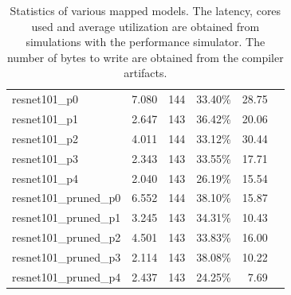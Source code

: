 \begin{table}[hbtp]
\begin{tabular}{@{}lrrrrr@{}}
resnet101\_p0           & 7.080                                                           & 144            & 33.40\%            & 28.75                                                             \\
resnet101\_p1           & 2.647                                                           & 143            & 36.42\%            & 20.06                                                             \\
resnet101\_p2           & 4.011                                                           & 144            & 33.12\%            & 30.44                                                             \\
resnet101\_p3           & 2.343                                                           & 143            & 33.55\%            & 17.71                                                             \\
resnet101\_p4           & 2.040                                                           & 143            & 26.19\%            & 15.54                                                             \\
resnet101\_pruned\_p0   & 6.552                                                           & 144            & 38.10\%            & 15.87                                                             \\
resnet101\_pruned\_p1   & 3.245                                                           & 143            & 34.31\%            & 10.43                                                             \\
resnet101\_pruned\_p2   & 4.501                                                           & 143            & 33.83\%            & 16.00                                                             \\
resnet101\_pruned\_p3   & 2.114                                                           & 143            & 38.08\%            & 10.22                                                             \\
resnet101\_pruned\_p4   & 2.437                                                           & 143            & 24.25\%            & 7.69                                                              \\
\bottomrule
\end{tabular}
\caption{
    Statistics of various mapped models.
    The latency, cores used and average utilization are obtained from simulations with the performance simulator.
    The number of bytes to write are obtained from the compiler artifacts.
}
\label{tab:example_models_stats}
\end{table}


